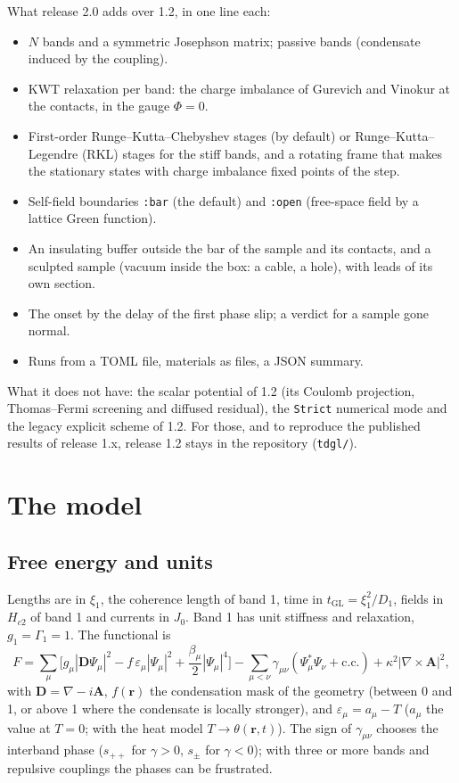 \documentclass[11pt,a4paper]{article}
\newcommand{\tGL}{t_{\mathrm{GL}}}
\newcommand{\code}[1]{\texttt{#1}}
\begin{document}
What release 2.0 adds over 1.2, in one line each:
\begin{itemize}
\item $N$ bands and a symmetric Josephson matrix; passive bands (condensate induced by the coupling).
\item KWT relaxation per band: the charge imbalance of Gurevich and Vinokur at the contacts, in the gauge $\Phi = 0$.
\item First-order Runge--Kutta--Chebyshev stages (by default) or Runge--Kutta--Legendre (RKL) stages for the stiff bands, and a
  rotating frame that makes the stationary
  states with charge imbalance fixed points of the step.
\item Self-field boundaries \code{:bar} (the default) and \code{:open} (free-space field by a lattice Green function).
\item An insulating buffer outside the bar of the sample and its contacts, and a sculpted sample (vacuum inside the box: a cable, a hole), with leads of its own section.
\item The onset by the delay of the first phase slip; a verdict for a sample gone normal.
\item Runs from a TOML file, materials as files, a JSON summary.
\end{itemize}

What it does not have: the scalar potential of 1.2 (its Coulomb projection, Thomas--Fermi screening and diffused
residual), the \code{Strict} numerical mode and the legacy explicit scheme of 1.2. For those, and to reproduce the published
results of release 1.x, release 1.2 stays in the repository (\code{tdgl/}).

\section{The model}

\subsection{Free energy and units}

Lengths are in $\xi_1$, the coherence length of band 1, time in $\tGL = \xi_1^2/D_1$, fields in $H_{c2}$ of band 1 and
currents in $J_0$. Band 1 has unit stiffness and relaxation, $g_1 = \Gamma_1 = 1$. The functional is
\begin{equation}
  F = \sum_\mu \Big[ g_\mu |\mathbf D\Psi_\mu|^2 - f\,\varepsilon_\mu |\Psi_\mu|^2 + \frac{\beta_\mu}{2}|\Psi_\mu|^4 \Big]
      - \sum_{\mu<\nu} \gamma_{\mu\nu} (\Psi_\mu^*\Psi_\nu + \mathrm{c.c.}) + \kappa^2 |\nabla\times\mathbf A|^2 ,
\end{equation}
with $\mathbf D = \nabla - i\mathbf A$, $f(\mathbf r)$ the condensation mask of the geometry (between 0 and 1, or above
1 where the condensate is locally stronger), and $\varepsilon_\mu = a_\mu - T$ ($a_\mu$ the value at $T = 0$; with the
heat model $T \to \theta(\mathbf r, t)$). The sign of $\gamma_{\mu\nu}$ chooses the interband phase ($s_{++}$ for
$\gamma > 0$, $s_\pm$ for $\gamma < 0$); with three or more bands and repulsive couplings the phases can be frustrated.
\end{document}

